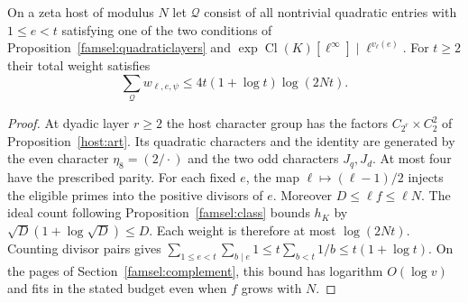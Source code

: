 \begin{corollary}\label{famsel:zetasubsum}
On a zeta host of modulus \(N\) let \(\mathcal Q\) consist of all
nontrivial quadratic entries with \(1\le e<t\) satisfying one of the
two conditions of Proposition~\ref{famsel:quadraticlayers} and
\(\exp\operatorname{Cl}(K)[\ell^\infty]\mid\ell^{v_\ell(e)}\).
For \(t\ge2\) their total weight satisfies
\[
 \sum_{\mathcal Q}w_{\ell,e,\psi}\le 4t(1+\log t)\log(2Nt).
\]
\end{corollary}
\begin{proof}
At dyadic layer \(r\ge2\) the host character group has the factors
\(C_{2^r}\times C_2^2\) of Proposition~\ref{host:art}. Its quadratic
characters and the identity are generated by the even character
\(\eta_8=(2/\cdot)\) and the two odd characters \(J_q,J_d\).
At most four have the prescribed parity. For each fixed \(e\), the map
\(\ell\mapsto(\ell-1)/2\) injects the eligible primes into the positive
divisors of \(e\). Moreover \(D\le\ell f\le\ell N\). The ideal count
following Proposition~\ref{famsel:class} bounds \(h_K\) by
\(\sqrt D(1+\log\sqrt D)\le D\). Each weight is therefore at most
\(\log(2Nt)\). Counting divisor pairs gives
\(\sum_{1\le e<t}\sum_{b\mid e}1\le t\sum_{b<t}1/b\le t(1+\log t)\).
On the pages of Section~\ref{famsel:complement}, this bound has logarithm
\(O(\log v)\) and fits in the stated budget even when \(f\) grows with \(N\).
\end{proof}

